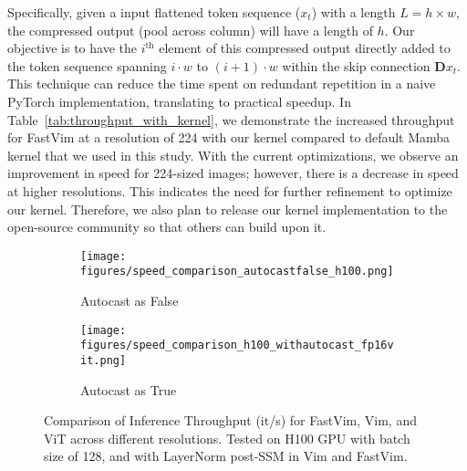 Specifically, given a input flattened token sequence ($x_t$) with a length $L = h \times w$, the compressed output (pool across column) will have a length of $h$. Our objective is to have the $i^{\text{th}}$ element of this compressed output directly added to the token sequence spanning \(i \cdot w\) to \((i+1) \cdot w\) within the skip connection \(\mathbf{D} x_t\). This technique can reduce the time spent on redundant repetition in a naive PyTorch implementation, translating to practical speedup. In Table~\ref{tab:throughput_with_kernel}, we demonstrate the increased throughput for FastVim at a resolution of 224 with our kernel compared to default Mamba kernel that we used in this study. With the current optimizations, we observe an improvement in speed for 224-sized images; however, there is a decrease in speed at higher resolutions. This indicates the need for further refinement to optimize our kernel. Therefore, we also plan to release our kernel implementation to the open-source community so that others can build upon it.









\begin{figure*}[!h]
    \centering
    \begin{subfigure}[b]{0.49\textwidth}
        \centering
        \texttt{[image: figures/speed\_comparison\_autocastfalse\_h100.png]}
        \caption{Autocast as False}
    \end{subfigure}
    \begin{subfigure}[b]{0.49\textwidth}
        \centering
        \texttt{[image: figures/speed\_comparison\_h100\_withautocast\_fp16vit.png]}
        \caption{Autocast as True}
    \end{subfigure}
    \caption{Comparison of Inference Throughput (it/s) for FastVim, Vim, and ViT across different resolutions. Tested on H100 GPU with batch size of 128, and with LayerNorm post-SSM in Vim and FastVim.}
    \label{fig:throughput_autocast_on}
\end{figure*}



